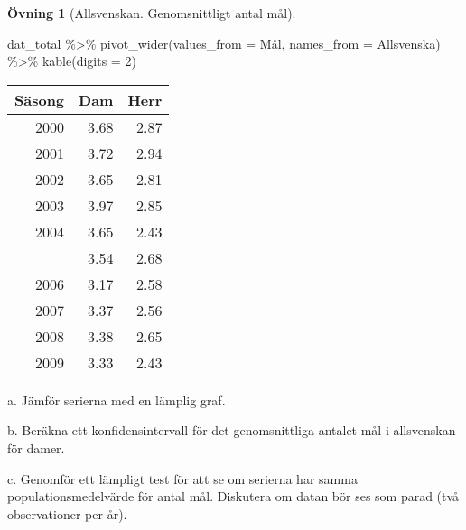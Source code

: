 \documentclass[
]{book}
\newenvironment{Shaded}{\begin{snugshade}}{\end{snugshade}}
\newcommand{\AttributeTok}[1]{\textcolor[rgb]{0.77,0.63,0.00}{#1}}
\newcommand{\DecValTok}[1]{\textcolor[rgb]{0.00,0.00,0.81}{#1}}
\newcommand{\FunctionTok}[1]{\textcolor[rgb]{0.00,0.00,0.00}{#1}}
\newcommand{\NormalTok}[1]{#1}
\newcommand{\SpecialCharTok}[1]{\textcolor[rgb]{0.00,0.00,0.00}{#1}}
\theoremstyle{definition}
\theoremstyle{definition}
\theoremstyle{definition}
\newtheorem{exercise}{Övning}[chapter]
\theoremstyle{definition}
\theoremstyle{remark}
\begin{document}
\begin{exercise}[Allsvenskan. Genomsnittligt antal mål]
\begin{Shaded}
\begin{Highlighting}[]
\NormalTok{dat\_total }\SpecialCharTok{\%\textgreater{}\%} 
  \FunctionTok{pivot\_wider}\NormalTok{(}\AttributeTok{values\_from =}\NormalTok{ Mål, }\AttributeTok{names\_from =}\NormalTok{ Allsvenska) }\SpecialCharTok{\%\textgreater{}\%} 
  \FunctionTok{kable}\NormalTok{(}\AttributeTok{digits =} \DecValTok{2}\NormalTok{)}
\end{Highlighting}
\end{Shaded}

\begin{table}
\centering
\begin{tabular}[t]{rrr}
\toprule
Säsong & Dam & Herr\\
\midrule
2000 & 3.68 & 2.87\\
2001 & 3.72 & 2.94\\
2002 & 3.65 & 2.81\\
2003 & 3.97 & 2.85\\
2004 & 3.65 & 2.43\\
\addlinespace
2005 & 3.54 & 2.68\\
2006 & 3.17 & 2.58\\
2007 & 3.37 & 2.56\\
2008 & 3.38 & 2.65\\
2009 & 3.33 & 2.43\\
\bottomrule
\end{tabular}
\end{table}

a. Jämför serierna med en lämplig graf.

b. Beräkna ett konfidensintervall för det genomsnittliga antalet mål i allsvenskan för damer.

c. Genomför ett lämpligt test för att se om serierna har samma populationsmedelvärde för antal mål. Diskutera om datan bör ses som parad (två observationer per år).
\end{exercise}
\end{document}
